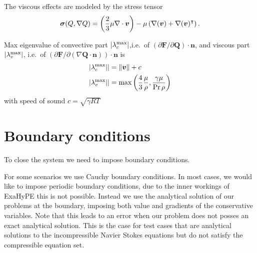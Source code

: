 
The viscous effects are modeled by the stress tensor
\begin{equation}
  \label{eq:stress-tensor}
  \bm{\sigma}(Q, \nabla Q) = \left(\frac{2}{3} \mu \nabla \cdot \bm{v} \right) -
  \mu \left( \nabla (\bm{v}) + \nabla ( \bm{v} )^\intercal \right).
\end{equation}

Max eigenvalue of convective part $\vert \lambda_c^{\text{max}} \vert$,i.e.\ of $\left( \partial \bm{F}/\partial \bm{Q}\right) \cdot \bm{n}$,
and viscous part $\vert \lambda_v^{\text{max}} \vert$, i.e.\ of $\left( \partial \bm{F}/\partial \left( \nabla \bm{Q} \cdot \bm{n} \right)\right) \cdot \bm{n}$
is
\begin{align}
  \vert \lambda_c^{\text{max}} \vert \vert  &= \Vert \bm{v} \Vert + c\\
  \vert \lambda_v^{\text{max}} \vert \vert &= \max \left( \frac{4}{3} \frac{\mu}{\rho}
                                       , \frac{\gamma \mu}{\Pr \rho} \right)
\end{align}
with speed of sound $c = \sqrt{\gamma R T }$

\section{Boundary conditions}
To close the system we need to impose boundary conditions.

For some scenarios we use Cauchy boundary conditions.
In most cases, we would like to impose periodic boundary conditions, due to the inner workings of ExaHyPE this is not possible.
Instead we use the analytical solution of our problems at the boundary, imposing both value and gradients of the conservative variables.
Note that this leads to an error when our problem does not posses an exact analytical solution.
This is the case for test cases that are analytical solutions to the incompressible Navier Stokes equations but do not satisfy the compressible equation set.

